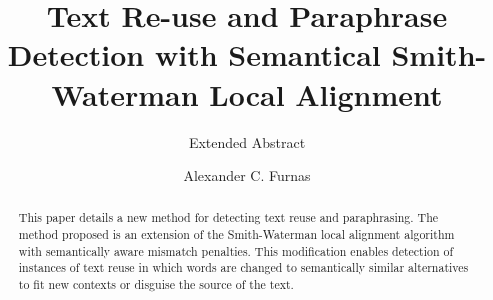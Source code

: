 \documentclass[sigconf]{acmart}
\begin{document}
\title{Text Re-use and Paraphrase Detection with Semantical Smith-Waterman Local Alignment}
\subtitle{Extended Abstract}


\author{Alexander C. Furnas}


\renewcommand{\shortauthors}{AC Furnas}


\begin{abstract}
This paper details a new method for detecting text reuse and paraphrasing. The method proposed is an extension of the Smith-Waterman local alignment algorithm with semantically aware mismatch penalties. This modification enables detection of instances of text reuse in which words are changed to semantically similar alternatives to fit new contexts or disguise the source of the text.  
\end{abstract}

%
%



\maketitle




 
\end{document}
